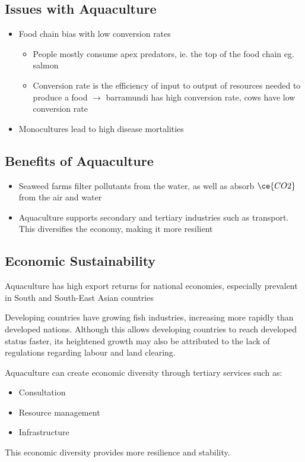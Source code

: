 	\subsection{Issues with Aquaculture}
	\begin{itemize}
		\item Food chain bias with low conversion rates
			\begin{itemize}
				\item People mostly consume apex predators, ie. the top of the food chain eg. salmon
				\item Conversion rate is the efficiency of input to output of resources needed to produce a food $\rightarrow$ barramundi has high conversion rate, cows have low conversion rate
			\end{itemize}
		\item Monocultures lead to high disease mortalities
	\end{itemize}

	\subsection{Benefits of Aquaculture}
		\begin{itemize}
			\item Seaweed farms filter pollutants from the water, as well as absorb $\ce{CO2}$ from the air and water
			\item Aquaculture supports secondary and tertiary industries such as transport. This diversifies the economy, making it more resilient
		\end{itemize}

	\subsection{Economic Sustainability}
		Aquaculture has high export returns for national economies, especially prevalent in South and South-East Asian countries

		Developing countries have growing fish industries, increasing more rapidly than developed nations. Although this allows developing countries to reach developed status faster, its heightened growth may also be attributed to the lack of regulations regarding labour and land clearing.

		Aquaculture can create economic diversity through tertiary services such as:
		\begin{itemize}
			\item Consultation
			\item Resource management
			\item Infrastructure
		\end{itemize}
		This economic diversity provides more resilience and stability.

